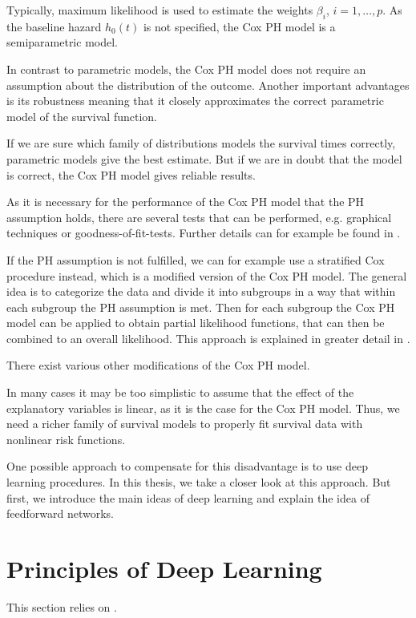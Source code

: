 \documentclass[12pt, a4paper]{scrartcl}
\theoremstyle{definition}
\theoremstyle{plain}
\numberwithin{equation}{section}
\numberwithin{figure}{section}
\numberwithin{table}{section}
\begin{document}
	Typically, maximum likelihood is used to estimate the weights $\beta_i$, $i=1,\dots ,p$.
	As the baseline hazard $h_0(t)$ is not specified, the Cox PH model is a semiparametric model.
	
	In contrast to parametric models, the Cox PH model does not require an assumption about the distribution of the outcome.
	Another important advantages is its robustness meaning that it closely approximates the correct parametric model of the survival function.
	
	If we are sure which family of distributions models the survival times correctly, parametric models give the best estimate.
	But if we are in doubt that the model is correct, the Cox PH model gives reliable results.
	
	As it is necessary for the performance of the Cox PH model that the PH assumption holds, there are several tests that can be performed, e.g. graphical techniques or goodness-of-fit-tests.
	Further details can for example be found in \citet*[Chapter~3]{sabook}.
	
	If the PH assumption is not fulfilled, we can for example use a stratified Cox procedure instead, which is a modified version of the Cox PH model.
	The general idea is to categorize the data and divide it into subgroups in a way that within each subgroup the PH assumption is met.
	Then for each subgroup the Cox PH model can be applied to obtain partial likelihood functions, that can then be combined to an overall likelihood.
	This approach is explained in greater detail in \citet*[Chapter~5]{sabook}.
	
	There exist various other modifications of the Cox PH model.
	
	In many cases it may be too simplistic to assume that the effect of the explanatory variables is linear, as it is the case for the Cox PH model.
	Thus, we need a richer family of survival models to properly fit survival data with nonlinear risk functions.
	
	One possible approach to compensate for this disadvantage is to use deep learning procedures.
	In this thesis, we take a closer look at this approach.
	But first, we introduce the main ideas of deep learning and explain the idea of feedforward networks.
	\newpage
	
	\section{Principles of Deep Learning}\label{basicsdl}
	This section relies on \citet*{deeplbook}.
	
\end{document}
